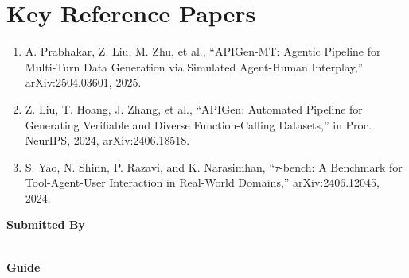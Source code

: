 \documentclass[11pt]{article}
\begin{document}
\section*{Key Reference Papers}
\begin{enumerate}
  \item A. Prabhakar, Z. Liu, M. Zhu, et al., ``APIGen-MT: Agentic Pipeline for Multi-Turn Data Generation via Simulated Agent-Human Interplay,'' arXiv:2504.03601, 2025.
  \item Z. Liu, T. Hoang, J. Zhang, et al., ``APIGen: Automated Pipeline for Generating Verifiable and Diverse Function-Calling Datasets,'' in Proc. NeurIPS, 2024, arXiv:2406.18518.
  \item S. Yao, N. Shinn, P. Razavi, and K. Narasimhan, ``$\tau$-bench: A Benchmark for Tool-Agent-User Interaction in Real-World Domains,'' arXiv:2406.12045, 2024.
\end{enumerate}
\vspace{0.8em}
\noindent\textbf{Submitted By}\\
\seminarName\\
\seminarRoll

\vspace{0.6em}
\noindent\textbf{Guide}\\
\seminarGuide
\end{document}
